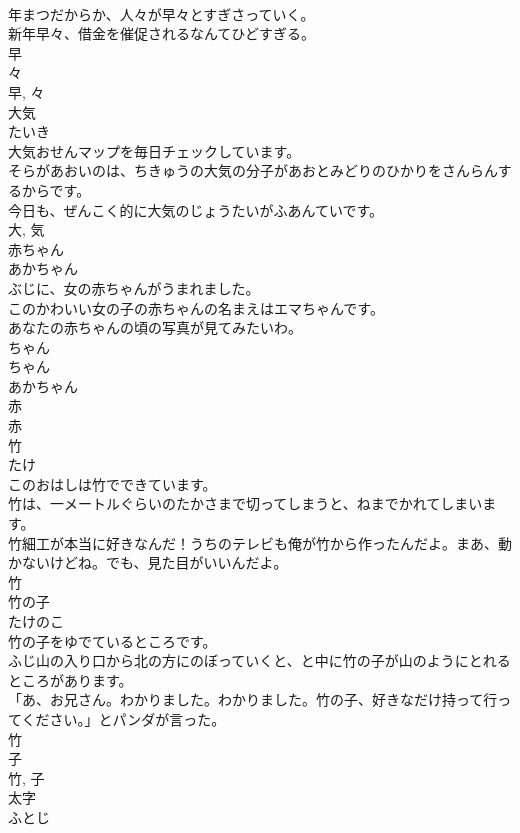 \documentclass[8pt]{extreport}
\begin{document}
\begin{CJK}{UTF8}{min}
\\	年まつだからか、人々が早々とすぎさっていく。	
\\	新年早々、借金を催促されるなんてひどすぎる。	
\\	早 
\\	々 
\\	早, 々	
\\	大気	
\\	たいき	
\\	大気おせんマップを毎日チェックしています。	
\\	そらがあおいのは、ちきゅうの大気の分子があおとみどりのひかりをさんらんするからです。	
\\	今日も、ぜんこく的に大気のじょうたいがふあんていです。	
\\	大, 気	
\\	赤ちゃん	
\\	あかちゃん	
\\	ぶじに、女の赤ちゃんがうまれました。	
\\	このかわいい女の子の赤ちゃんの名まえはエマちゃんです。	
\\	あなたの赤ちゃんの頃の写真が見てみたいわ。	
\\	ちゃん 
\\	ちゃん 
\\	あかちゃん 
\\	赤 
\\	赤	
\\	竹	
\\	たけ	
\\	このおはしは竹でできています。	
\\	竹は、一メートルぐらいのたかさまで切ってしまうと、ねまでかれてしまいます。	
\\	竹細工が本当に好きなんだ！うちのテレビも俺が竹から作ったんだよ。まあ、動かないけどね。でも、見た目がいいんだよ。	
\\	竹	
\\	竹の子	
\\	たけのこ	
\\	竹の子をゆでているところです。	
\\	ふじ山の入り口から北の方にのぼっていくと、と中に竹の子が山のようにとれるところがあります。	
\\	「あ、お兄さん。わかりました。わかりました。竹の子、好きなだけ持って行ってください。」とパンダが言った。	
\\	竹 
\\	子 
\\	竹, 子	
\\	太字	
\\	ふとじ	

\end{CJK}
\end{document}
